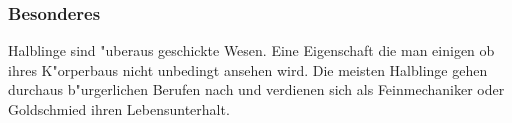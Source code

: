 \subsubsection{Besonderes}
\par Halblinge sind "uberaus geschickte Wesen. Eine Eigenschaft
die man einigen ob ihres K"orperbaus nicht unbedingt ansehen wird.
Die meisten Halblinge gehen durchaus b"urgerlichen Berufen nach und
verdienen sich als Feinmechaniker oder Goldschmied ihren
Lebensunterhalt.
